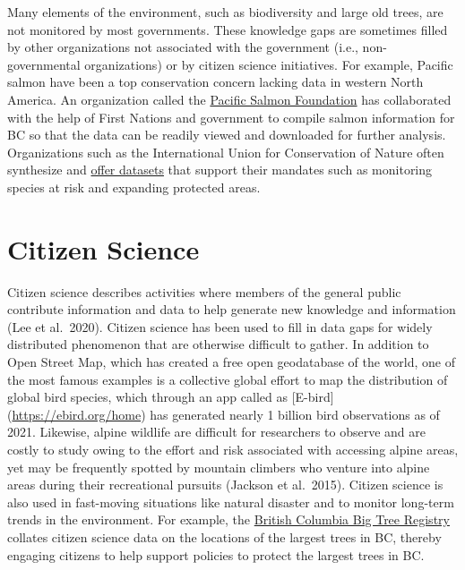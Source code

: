 \documentclass[
]{book}
\begin{document}
Many elements of the environment, such as biodiversity and large old trees, are not monitored by most governments. These knowledge gaps are sometimes filled by other organizations not associated with the government (i.e., non-governmental organizations) or by citizen science initiatives. For example, Pacific salmon have been a top conservation concern lacking data in western North America. An organization called the \href{https://www.salmonexplorer.ca/\#!/}{Pacific Salmon Foundation} has collaborated with the help of First Nations and government to compile salmon information for BC so that the data can be readily viewed and downloaded for further analysis. Organizations such as the International Union for Conservation of Nature often synthesize and \href{https://www.iucn.org/resources/conservation-tools}{offer datasets} that support their mandates such as monitoring species at risk and expanding protected areas.

\hypertarget{citizen-science}{%
\section{Citizen Science}\label{citizen-science}}

Citizen science describes activities where members of the general public contribute information and data to help generate new knowledge and information (Lee et al.~2020). Citizen science has been used to fill in data gaps for widely distributed phenomenon that are otherwise difficult to gather. In addition to Open Street Map, which has created a free open geodatabase of the world, one of the most famous examples is a collective global effort to map the distribution of global bird species, which through an app called as {[}E-bird{]} (\url{https://ebird.org/home}) has generated nearly 1 billion bird observations as of 2021. Likewise, alpine wildlife are difficult for researchers to observe and are costly to study owing to the effort and risk associated with accessing alpine areas, yet may be frequently spotted by mountain climbers who venture into alpine areas during their recreational pursuits (Jackson et al.~2015). Citizen science is also used in fast-moving situations like natural disaster and to monitor long-term trends in the environment. For example, the \href{https://bigtrees.forestry.ubc.ca/bc-bigtree-registry/}{British Columbia Big Tree Registry} collates citizen science data on the locations of the largest trees in BC, thereby engaging citizens to help support policies to protect the largest trees in BC.
\end{document}
